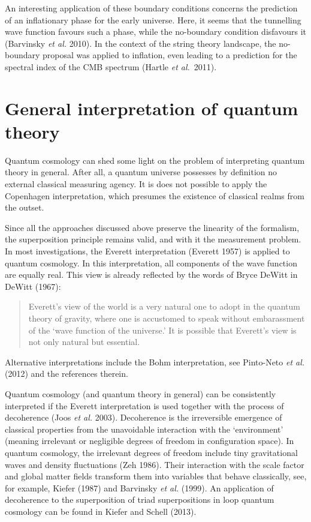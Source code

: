 \documentclass[12pt,a4paper]{article}
\begin{document}
An interesting application of these boundary conditions concerns the
prediction of an inflationary phase for the early universe. Here, it
seems that the tunnelling wave function favours such a phase, while
the no-boundary condition disfavours it (Barvinsky {\em et al.}
2010). In the context of the string theory landscape, the no-boundary
proposal was applied to inflation, even leading to a prediction
for the spectral index of the CMB spectrum (Hartle {\em et al.}~2011).   


\section{General interpretation of quantum theory}

Quantum cosmology can shed some light on the problem of interpreting
quantum theory in general. After all, a quantum universe possesses by
definition no external classical measuring agency. It is does not
possible to apply the Copenhagen interpretation, which presumes the
existence of classical realms from the outset. 

Since all the approaches discussed above preserve the linearity of the
formalism, the superposition principle remains valid, and with it the
measurement problem. In most investigations, the Everett
interpretation (Everett 1957) is applied to quantum cosmology. In this
interpretation, all components of the wave function are equally real.
This view is already reflected by the words of Bryce DeWitt in DeWitt
(1967):
\begin{quote}
Everett's view of the world is a very natural one to adopt in the
quantum theory of gravity, where one is accustomed to speak without
embarassment of the `wave function of the universe.' It is possible
that Everett's view is not only natural but essential.
\end{quote}
Alternative interpretations include the Bohm interpretation, see
Pinto-Neto {\em et al.} (2012) and the references therein.

Quantum cosmology (and quantum theory in general) can be consistently
interpreted if the Everett interpretation is used together with the
process of decoherence (Joos {\em et al.} 2003). Decoherence is the
irreversible emergence of classical properties from the unavoidable
interaction with the `environment' (meaning irrelevant or negligible
degrees of freedom in configuration space). In quantum cosmology, the
irrelevant degrees of freedom include tiny gravitational waves and
density fluctuations (Zeh 1986). Their interaction with the scale
factor and global matter fields transform them into variables that
behave classically, see, for example, Kiefer (1987) and Barvinsky {\em
et al.} (1999). An application of decoherence to the superposition of
triad superpositions in loop quantum cosmology can be found in Kiefer
and Schell (2013).
\end{document}
